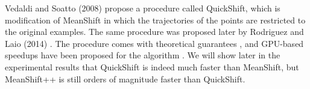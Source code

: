 Vedaldi and Soatto (2008) \cite{vedaldi2008quick} propose a procedure called QuickShift, which is modification of MeanShift in which the trajectories of the points are restricted to the original examples. The same procedure was proposed later by Rodriguez and Laio (2014) \cite{rodriguez2014clustering}. The procedure comes with theoretical guarantees \cite{jiang2017consistency}, and GPU-based speedups have been proposed for the algorithm \cite{fulkerson2010really}. We will show later in the experimental results that QuickShift is indeed much faster than MeanShift, but MeanShift++ is still orders of magnitude faster than QuickShift.